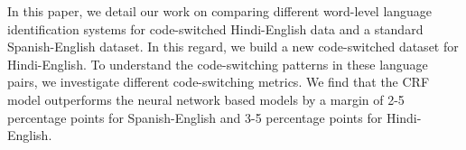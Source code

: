 In this paper, we detail our work on comparing different word-level language identification systems for code-switched Hindi-English data and a standard Spanish-English dataset. In this regard, we build a new code-switched dataset for Hindi-English. To understand the code-switching patterns in these language pairs, we investigate different code-switching metrics. We find that the CRF model outperforms the neural network based models by a margin of 2-5 percentage points for Spanish-English and 3-5 percentage points for Hindi-English.
